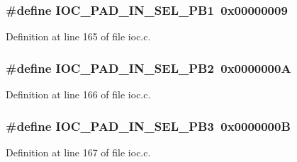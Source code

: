 \subsubsection[{\texorpdfstring{I\+O\+C\+\_\+\+P\+A\+D\+\_\+\+I\+N\+\_\+\+S\+E\+L\+\_\+\+P\+B1}{IOC_PAD_IN_SEL_PB1}}]{\setlength{\rightskip}{0pt plus 5cm}\#define I\+O\+C\+\_\+\+P\+A\+D\+\_\+\+I\+N\+\_\+\+S\+E\+L\+\_\+\+P\+B1~0x00000009}\hypertarget{group__ioc__api_gadd0d0da3843b1c6e42b69304bbf52e54}{}\label{group__ioc__api_gadd0d0da3843b1c6e42b69304bbf52e54}


Definition at line 165 of file ioc.\+c.

\subsubsection[{\texorpdfstring{I\+O\+C\+\_\+\+P\+A\+D\+\_\+\+I\+N\+\_\+\+S\+E\+L\+\_\+\+P\+B2}{IOC_PAD_IN_SEL_PB2}}]{\setlength{\rightskip}{0pt plus 5cm}\#define I\+O\+C\+\_\+\+P\+A\+D\+\_\+\+I\+N\+\_\+\+S\+E\+L\+\_\+\+P\+B2~0x0000000A}\hypertarget{group__ioc__api_ga059453f4479663b05984d8cdf4c1e2b8}{}\label{group__ioc__api_ga059453f4479663b05984d8cdf4c1e2b8}


Definition at line 166 of file ioc.\+c.

\subsubsection[{\texorpdfstring{I\+O\+C\+\_\+\+P\+A\+D\+\_\+\+I\+N\+\_\+\+S\+E\+L\+\_\+\+P\+B3}{IOC_PAD_IN_SEL_PB3}}]{\setlength{\rightskip}{0pt plus 5cm}\#define I\+O\+C\+\_\+\+P\+A\+D\+\_\+\+I\+N\+\_\+\+S\+E\+L\+\_\+\+P\+B3~0x0000000B}\hypertarget{group__ioc__api_ga7e17e23c7ddd14dc6f75efd801512be1}{}\label{group__ioc__api_ga7e17e23c7ddd14dc6f75efd801512be1}


Definition at line 167 of file ioc.\+c.

